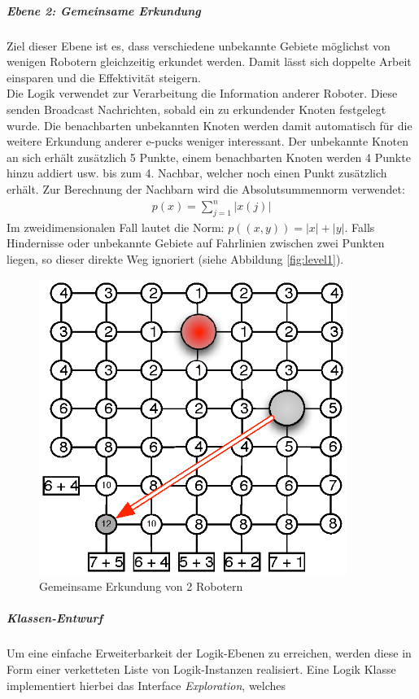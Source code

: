 \documentclass[10pt,a4paper]{article}
\begin{document}
  				\subparagraph*{Ebene 2: Gemeinsame Erkundung} Ziel dieser Ebene ist es, dass verschiedene unbekannte Gebiete möglichst von
  					wenigen Robotern gleichzeitig erkundet werden. Damit lässt sich doppelte Arbeit einsparen und die Effektivität steigern.\\
  					Die Logik verwendet zur Verarbeitung die Information anderer Roboter. Diese senden Broadcast Nachrichten, sobald ein zu erkundender
  					Knoten festgelegt wurde. Die benachbarten unbekannten Knoten werden damit automatisch für die weitere Erkundung anderer e-pucks
  					weniger interessant. Der unbekannte Knoten an sich erhält zusätzlich	5 	Punkte, einem benachbarten Knoten werden 4 Punkte hinzu
  					addiert usw. bis zum 4. Nachbar, welcher noch einen Punkt zusätzlich erhält. Zur Berechnung der Nachbarn wird die Absolutsummennorm
  					verwendet:
					\begin{eqnarray}
						p(x) = \sum_{j=1}^n |x(j)|
					\end{eqnarray}
					Im zweidimensionalen Fall lautet die Norm: $p((x,y))=|x| + |y|$. Falls Hindernisse oder unbekannte Gebiete auf Fahrlinien zwischen
					zwei Punkten liegen, so dieser direkte Weg ignoriert (siehe Abbildung \ref{fig:level1}). 			
					\begin{figure}[h]
						\centering
						\includegraphics[width=10cm]{images/kooperation.eps}
  						\caption{Gemeinsame Erkundung von 2 Robotern}
  						\label{fig:level2}
  					\end{figure} 
  				\subparagraph*{Klassen-Entwurf} Um eine einfache Erweiterbarkeit der Logik-Ebenen zu erreichen, werden diese in Form einer
  					verketteten Liste von Logik-Instanzen realisiert. Eine Logik Klasse implementiert hierbei das Interface \textit{Exploration}, welches
\end{document}
